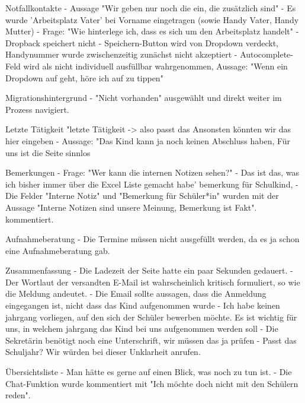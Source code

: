 Notfallkontakte
- Aussage "Wir geben nur noch die ein, die zusätzlich sind"
- Es wurde 'Arbeitsplatz Vater' bei Vorname eingetragen (sowie Handy Vater, Handy Mutter)
- Frage: "Wie hinterlege ich, dass es sich um den Arbeitsplatz handelt"	
- Dropback speichert nicht
- Speichern-Button wird von Dropdown verdeckt, Handynummer wurde zwischenzeitig zunächst nicht akzeptiert	
- Autocomplete-Feld wird als nicht individuell ausfüllbar wahrgenommen, Aussage: "Wenn ein Dropdown auf geht, höre ich auf zu tippen"							










Migrationshintergrund
- "Nicht vorhanden" ausgewählt und direkt weiter im Prozess navigiert.	














Letzte Tätigkeit
"letzte Tätigkeit -> also passt das 
Ansonsten könnten wir das hier eingeben
- Aussage: "Das Kind kann ja noch keinen Abschluss haben, Für uns ist die Seite sinnlos

Bemerkungen 
- Frage: "Wer kann die internen Notizen sehen?"
- Das ist das, was ich bisher immer über die Excel Liste gemacht habe' bemerkung für Schulkind, 
- Die Felder "Interne Notiz" und "Bemerkung für Schüler*in" wurden mit der Aussage "Interne Notizen sind unsere Meinung, Bemerkung ist Fakt".  kommentiert.									

Aufnahmeberatung										
- Die Termine müssen nicht ausgefüllt werden, da es ja schon eine Aufnahmeberatung gab.

Zusammenfassung
- Die Ladezeit der Seite hatte ein paar Sekunden gedauert.
- Der Wortlaut der versandten E-Mail ist wahrscheinlich kritisch formuliert, so wie die Meldung andeutet.
- Die Email sollte aussagen, dass die Anmeldung eingegangen ist, nicht dass das Kind aufgenommen wurde
- Ich habe keinen jahrgang vorliegen, auf den sich der Schüler bewerben möchte. Es ist wichtig für uns, in welchem jahrgang das Kind bei uns aufgenommen werden soll
- Die Sekretärin benötigt noch eine Unterschrift, wir müssen das ja prüfen
- Passt das Schuljahr? Wir würden bei dieser Unklarheit anrufen.

Übersichtsliste
- Man hätte es gerne auf einen Blick, was noch zu tun ist.
- Die Chat-Funktion wurde kommentiert mit "Ich möchte doch nicht mit den Schülern reden".

